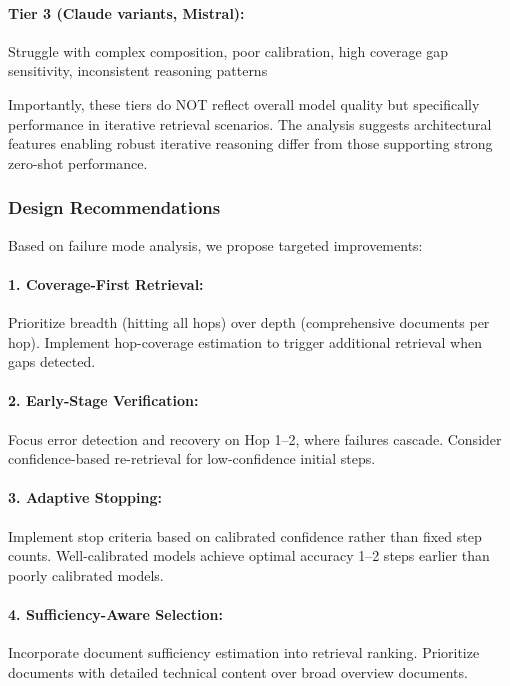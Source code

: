 \paragraph{Tier 3 (Claude variants, Mistral):} Struggle with complex composition, poor calibration, high coverage gap sensitivity, inconsistent reasoning patterns

Importantly, these tiers do NOT reflect overall model quality but specifically performance in iterative retrieval scenarios. The analysis suggests architectural features enabling robust iterative reasoning differ from those supporting strong zero-shot performance.

\subsubsection{Design Recommendations}

Based on failure mode analysis, we propose targeted improvements:

\paragraph{1. Coverage-First Retrieval:} Prioritize breadth (hitting all hops) over depth (comprehensive documents per hop). Implement hop-coverage estimation to trigger additional retrieval when gaps detected.

\paragraph{2. Early-Stage Verification:} Focus error detection and recovery on Hop 1--2, where failures cascade. Consider confidence-based re-retrieval for low-confidence initial steps.

\paragraph{3. Adaptive Stopping:} Implement stop criteria based on calibrated confidence rather than fixed step counts. Well-calibrated models achieve optimal accuracy 1--2 steps earlier than poorly calibrated models.

\paragraph{4. Sufficiency-Aware Selection:} Incorporate document sufficiency estimation into retrieval ranking. Prioritize documents with detailed technical content over broad overview documents.

